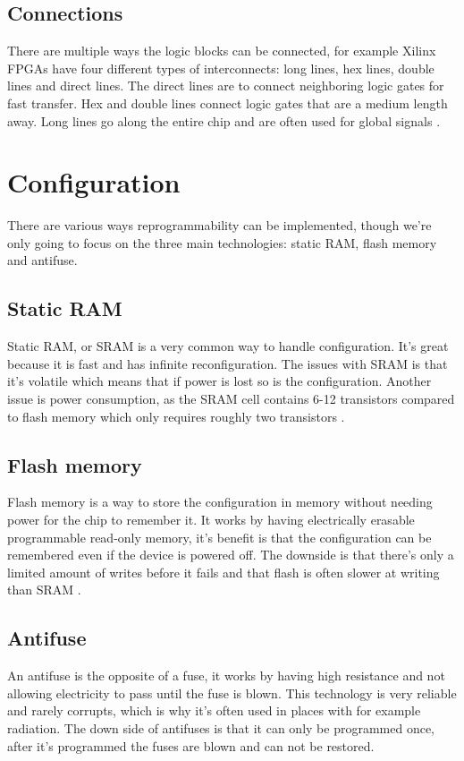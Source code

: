 \subsection{Connections}
There are multiple ways the logic blocks can be connected, for example Xilinx
FPGAs have four different types of interconnects: long lines, hex lines, double
lines and direct lines. The direct lines are to connect neighboring logic gates
for fast transfer. Hex and double lines connect logic gates that are a medium
length away. Long lines go along the entire chip and are often used for global
signals \cite{amano_principles_2018}.


\section{Configuration}
There are various ways reprogrammability can be implemented, though we're only
going to focus on the three main technologies: static RAM, flash memory and
antifuse.

\subsection{Static RAM}
Static RAM, or SRAM is a very common way to handle configuration. It's great
because it is fast and has infinite reconfiguration. The issues with SRAM is
that it's volatile which means that if power is lost so is the configuration.
Another issue is power consumption, as the SRAM cell contains 6-12 transistors
compared to flash memory which only requires roughly two transistors
\cite{amano_principles_2018}.

\subsection{Flash memory}
Flash memory is a way to store the configuration in memory without needing
power for the chip to remember it. It works by having electrically erasable
programmable read-only memory, it's benefit is that the configuration can be
remembered even if the device is powered off. The downside is that there's only
a limited amount of writes before it fails and that flash is often slower at
writing than SRAM \cite{m_d_mano_digital_2012}.

\subsection{Antifuse}
An antifuse is the opposite of a fuse, it works by having high resistance and
not allowing electricity to pass until the fuse is blown. This technology is
very reliable and rarely corrupts, which is why it's often used in places with
for example radiation. The down side of antifuses is that it can only be
programmed once, after it's programmed the fuses are blown and can not be
restored.
